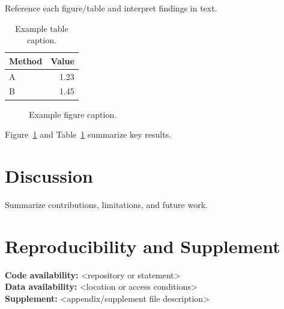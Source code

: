\documentclass[12pt]{article}
\begin{document}
Reference each figure/table and interpret findings in text.

\begin{table}[tbp]
\centering
\caption{Example table caption.}
\label{tab:example}
\begin{tabular}{lr}
\toprule
Method & Value \\
\midrule
A & 1.23 \\
B & 1.45 \\
\bottomrule
\end{tabular}
\end{table}

\begin{figure}[tbp]
\centering
\fbox{\rule{0pt}{1.5in}\rule{0.8\linewidth}{0pt}}
\caption{Example figure caption.}
\label{fig:example}
\end{figure}

Figure~\ref{fig:example} and Table~\ref{tab:example} summarize key results.

\section{Discussion}\label{sec:discussion}

Summarize contributions, limitations, and future work.

\section*{Reproducibility and Supplement}

\textbf{Code availability:} <repository or statement>\\
\textbf{Data availability:} <location or access conditions>\\
\textbf{Supplement:} <appendix/supplement file description>

% 
% 
\end{document}
